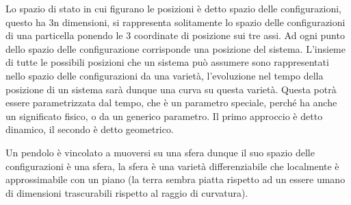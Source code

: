\documentclass[
10pt, %
a4paper, %
oneside, %
headinclude,footinclude, %
BCOR5mm, %
]{scrartcl}
\begin{document}
\begin{definizione}
	Lo spazio di stato in cui figurano le posizioni è detto spazio delle configurazioni, questo ha 3n dimensioni, si rappresenta solitamente lo spazio delle configurazioni di una particella ponendo le 3 coordinate di posizione sui tre assi.  Ad ogni punto dello spazio delle configurazione corrisponde una posizione del sistema. L'insieme di tutte le possibili posizioni che un sistema può assumere sono rappresentati nello spazio delle configurazioni da una varietà, l'evoluzione nel tempo della posizione di un sistema sarà dunque una curva su questa varietà. Questa potrà essere parametrizzata dal tempo, che è un parametro speciale, perché ha anche un significato fisico, o da un generico parametro. Il primo approccio è detto dinamico, il secondo è detto geometrico. 
\end{definizione}
\begin{esempio}
	Un pendolo è vincolato a muoversi su una sfera dunque il suo spazio delle configurazioni è una sfera, la sfera è una varietà differenziabile che localmente è approssimabile con un piano (la terra sembra piatta rispetto ad un essere umano di dimensioni trascurabili rispetto al raggio di curvatura).
\end{esempio}
\end{document}
